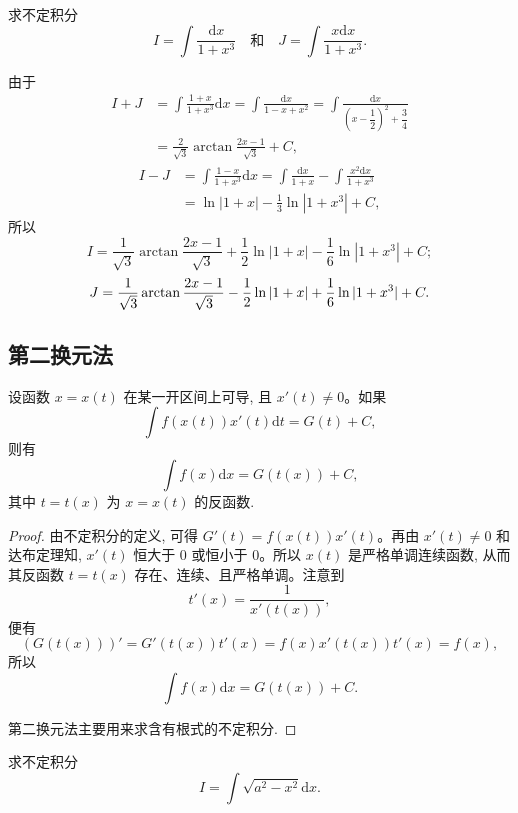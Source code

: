 \begin{example}\label{example:ma-6-2-13}
求不定积分
\[
  I=\int\frac{\mathrm dx}{1+x^3}
  \quad\text{和}\quad
  J=\int\frac{x\mathrm dx}{1+x^3}.
\]
\end{example}


\begin{solve}
由于
\[
\begin{aligned}
  I+J
  &=
  \int\frac{1+x}{1+x^3}\mathrm dx
  =
  \int\frac{\mathrm dx}{1-x+x^2}
  =
  \int\frac{\mathrm dx}{\left(x-\dfrac12\right)^2+\dfrac34}\\
  &=
  \frac2{\sqrt3}\arctan\frac{2x-1}{\sqrt3}+C,
\end{aligned}
\]
\[
\begin{aligned}
  I-J
  &=
  \int\frac{1-x}{1+x^3}\mathrm dx
  =
  \int\frac{\mathrm dx}{1+x}
  -
  \int\frac{x^2\mathrm dx}{1+x^3}\\
  &=
  \ln|1+x|-\frac13\ln|1+x^3|+C,
\end{aligned}
\]
所以
\[
  I=
  \frac1{\sqrt3}\arctan\frac{2x-1}{\sqrt3}
  +
  \frac12\ln|1+x|-\frac16\ln|1+x^3|+C;
\]
\[
  J=
  \frac1{\sqrt3}\arctan\frac{2x-1}{\sqrt3}
  -
  \frac12\ln|1+x|+\frac16\ln|1+x^3|+C.
\qedhere
\]
\end{solve}


\subsection{第二换元法}
\label{subsec:ma-6-2-2}

\begin{theorem}\label{theorem:ma-6-2-2}
设函数 $x=x(t)$ 在某一开区间上可导, 且 $x'(t)\ne0$。如果
\[
  \int f(x(t))x'(t)\mathrm dt=G(t)+C,
\]
则有
\[
  \int f(x)\mathrm dx=G(t(x))+C,
\]
其中 $t=t(x)$ 为 $x=x(t)$ 的反函数.
\end{theorem}


\begin{proof}
由不定积分的定义, 可得 $G'(t)=f(x(t))x'(t)$。再由 $x'(t)\ne0$ 和达布定理知, $x'(t)$ 恒大于 $0$ 或恒小于 $0$。所以 $x(t)$ 是严格单调连续函数, 从而其反函数 $t=t(x)$ 存在、连续、且严格单调。注意到
\[
  t'(x)=\frac1{x'(t(x))},
\]
便有
\[
  (G(t(x)))'=G'(t(x))t'(x)=f(x)x'(t(x))t'(x)=f(x),
\]
所以
\[
  \int f(x)\mathrm dx=G(t(x))+C.
\]

第二换元法主要用来求含有根式的不定积分.
\end{proof}


\begin{example}\label{example:ma-6-2-14}
求不定积分
\[
  I=\int\sqrt{a^2-x^2}\mathrm dx.
\]
\end{example}


